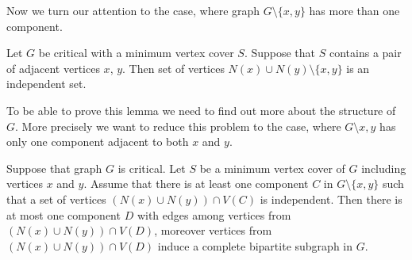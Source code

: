 Now we turn our attention to the case, where graph \(G \setminus \{x, y\}\) has more than one component.
\begin{lemma}\label{VC:morecomp}
	Let \(G\) be critical with a minimum vertex cover \(S\).
	Suppose that \(S\) contains a pair of adjacent vertices \(x\), \(y\).
	Then set of vertices \(N(x) \cup N(y) \setminus \{x, y\}\) is an independent set.
\end{lemma}
To be able to prove this lemma we need to find out more about the structure of \(G\).
More precisely we want to reduce this problem to the case, where \(G \setminus {x, y}\) has only one component adjacent to both \(x\) and \(y\).

\begin{lemma}\label{VC:Char}
	Suppose that graph \(G\) is critical. Let \(S\) be a minimum vertex cover of \(G\) including vertices \(x\) and \(y\).
	Assume that there is at least one component \(C\) in \(G \setminus \{x, y\}\) such that a set of vertices \((N(x) \cup N(y)) \cap V(C)\) is independent.
	Then there is at most one component \(D\) with edges among vertices from \((N(x) \cup N(y)) \cap V(D)\), moreover vertices from \((N(x) \cup N(y)) \cap V(D)\)
	induce a complete bipartite subgraph in \(G\).
\end{lemma}

